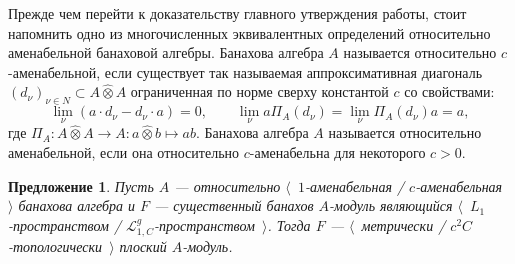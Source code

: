 \documentclass[12pt]{article}
\newtheorem{proposition}[theorem]{Предложение}
\newcommand{\projtens}{\mathbin{\widehat{\otimes}}}
\begin{document}
Прежде чем перейти к доказательству главного утверждения работы,
стоит напомнить одно из многочисленных эквивалентных определений относительно аменабельной банаховой алгебры. Банахова алгебра $A$ называется относительно $c$-аменабельной, если существует так называемая аппроксимативная диагональ $(d_\nu)_{\nu\in N}\subset A\projtens A$ ограниченная по норме сверху константой $c$ со свойствами:
\[
\lim_\nu(a\cdot d_\nu-d_\nu\cdot a)=0,\qquad \lim_\nu a \Pi_A(d_\nu)=\lim_\nu\Pi_A(d_\nu)a=a,
\]
где $\Pi_A:A\projtens A\to A:a\projtens b\mapsto ab$. Банахова алгебра $A$ называется относительно аменабельной, если она относительно $c$-аменабельна для некоторого $c>0$.

\begin{proposition}\label{MetTopEssL1FlatModAoverAmenBanAlg} Пусть $A$ --- относительно $\langle$~$1$-аменабельная / $c$-аменабельная~$\rangle$ банахова алгебра и $F$ --- существенный банахов $A$-модуль являющийся $\langle$~$L_1$-пространством / $\mathcal{L}_{1,C}^g$-пространством~$\rangle$. Тогда $F$ --- $\langle$~метрически / $c^2C$-топологически~$\rangle$ плоский $A$-модуль.
\end{proposition}
\end{document}
